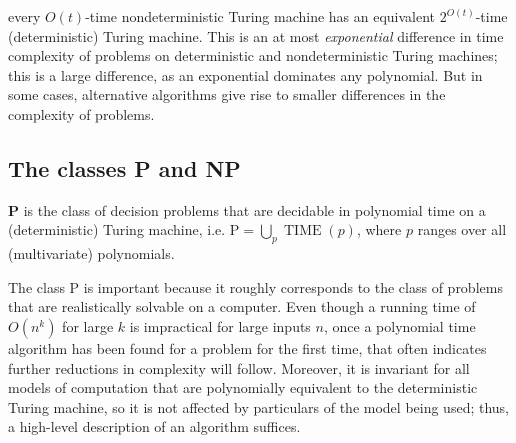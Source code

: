  every $O(t)$-time nondeterministic Turing machine has an equivalent $2^{O(t)}$-time (deterministic) Turing machine. This is an at most \textit{exponential} difference in time complexity of problems on deterministic and nondeterministic Turing machines; this is a large difference, as an exponential dominates any polynomial. But in some cases, alternative algorithms give rise to smaller differences in the complexity of problems.

\subsection{The classes P and NP}

\begin{definition}\label{def:class_P}
    \textbf{P} is the class of decision problems that are decidable in polynomial time  on a (deterministic) Turing machine, i.e. $\mathrm{P} = \bigcup_p \operatorname{TIME}(p)$, where $p$ ranges over all (multivariate) polynomials.
\end{definition}

The class P is important because it roughly corresponds to the class of problems that are  realistically solvable on a computer. Even though a running time of $O(n^k)$ for large $k$ is impractical for large inputs $n$, once a polynomial time algorithm has been found for a problem for the first time, that often indicates further reductions in complexity will follow. Moreover, it is invariant for all models of computation that are polynomially equivalent to the deterministic Turing machine, so it is not affected by particulars of the model being used; thus, a high-level description of an algorithm suffices.



